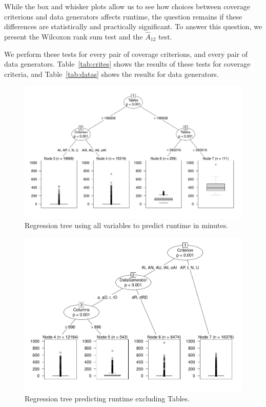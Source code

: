 While the box and whisker plots allow us to see how choices between coverage criterions and data generators affects
runtime, the question remains if these differences are statistically and practically significant. To answer this
question, we present the Wilcoxon rank sum test and the $\hat{A}_{12}$ test.


We perform these tests for every pair of coverage criterions, and every pair of data generators.  Table~\ref{tab:crites}
shows the results of these tests for coverage criteria, and Table~\ref{tab:datas} shows the results for data generators.

\begin{figure}
\centering
  \centering
  \includegraphics[width=.75\linewidth]{diagrams/AllTree.pdf}
  \caption{Regression tree using all variables to predict runtime in
  minutes. \vspace{-.15in}}
  \label{fig:atree}
  \vspace{-.15in}
\end{figure}

\begin{figure}
\centering
  \centering
  \includegraphics[width=.75\linewidth]{diagrams/NoTableCtreesd.pdf}
  \caption{Regression tree predicting runtime excluding Tables.\vspace{-.15in}}
  \label{fig:ttree}
  \vspace{-.15in}
\end{figure}


